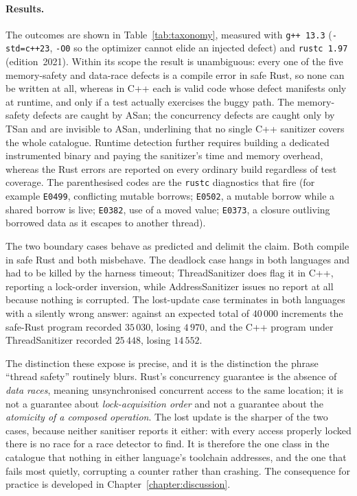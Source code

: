 \documentclass[english,twoside,openright,a4paper,censored,csm,software-track-2020]{HYthesisML}
\begin{document}
\paragraph{Results.}
The outcomes are shown in Table~\ref{tab:taxonomy}, measured with \texttt{g++~13.3}
(\texttt{-std=c++23}, \texttt{-O0} so the optimizer cannot elide an injected defect) and
\texttt{rustc~1.97} (edition~2021). Within its scope the result is unambiguous: every one of
the five memory-safety and data-race defects is a compile error in safe Rust, so none can be
written at all, whereas in C++ each is valid code whose defect manifests only at runtime, and
only if a test actually exercises the buggy path. The memory-safety defects are caught by ASan;
the concurrency defects are caught only by TSan and are invisible to ASan, underlining that no
single C++ sanitizer covers the whole catalogue. Runtime detection further requires building a
dedicated instrumented binary and paying the sanitizer's time and memory overhead, whereas the
Rust errors are reported on every ordinary build regardless of test coverage. The parenthesised
codes are the \texttt{rustc} diagnostics that fire (for example \texttt{E0499}, conflicting
mutable borrows; \texttt{E0502}, a mutable borrow while a shared borrow is live; \texttt{E0382},
use of a moved value; \texttt{E0373}, a closure outliving borrowed data as it escapes to another
thread).

The two boundary cases behave as predicted and delimit the claim. Both compile in safe Rust and
both misbehave. The deadlock case hangs in both languages and had to be killed by the harness
timeout; ThreadSanitizer does flag it in C++, reporting a lock-order inversion, while
AddressSanitizer issues no report at all because nothing is corrupted. The lost-update case
terminates in both languages with a silently wrong answer: against an expected total of
$40\,000$ increments the safe-Rust program recorded $35\,030$, losing $4\,970$, and the C++
program under ThreadSanitizer recorded $25\,448$, losing $14\,552$.

The distinction these expose is precise, and it is the distinction the phrase ``thread safety''
routinely blurs. Rust's concurrency guarantee is the absence of \emph{data races}, meaning
unsynchronised concurrent access to the same location; it is not a guarantee about
\emph{lock-acquisition order} and not a guarantee about the \emph{atomicity of a composed
operation}. The lost update is the sharper of the two cases, because neither sanitiser reports
it either: with every access properly locked there is no race for a race detector to find. It
is therefore the one class in the catalogue that nothing in either language's toolchain
addresses, and the one that fails most quietly, corrupting a counter rather than crashing. The
consequence for practice is developed in Chapter~\ref{chapter:discussion}.
\end{document}
